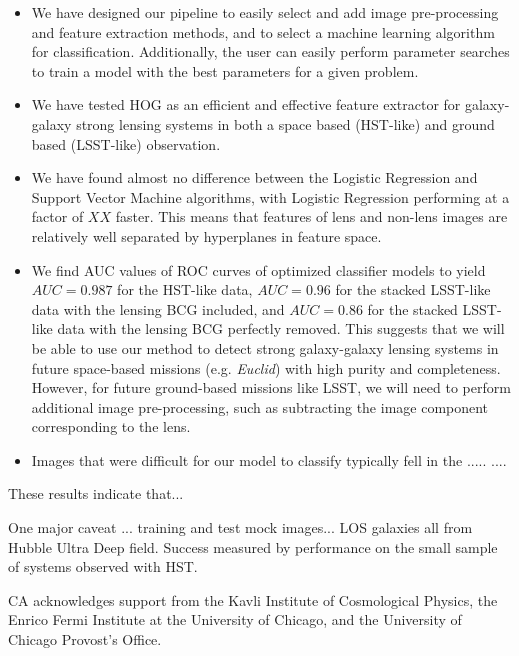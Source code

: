 \documentclass{emulateapj}
\begin{document}
\begin{itemize}

\item We have designed our pipeline to easily select and add image
  pre-processing and feature extraction methods, and to select a
  machine learning algorithm for classification.  Additionally, the
  user can easily perform parameter searches to train a model with the
  best parameters for a given problem.

\item We have tested HOG as an efficient and effective feature
  extractor for galaxy-galaxy strong lensing systems in both a space
  based (HST-like) and ground based (LSST-like) observation.  

\item We have found almost no difference between the Logistic
  Regression and Support Vector Machine algorithms, with Logistic
  Regression performing at a factor of $XX$ faster.  This means that
  features of lens and non-lens images are relatively well separated
  by hyperplanes in feature space.

\item We find AUC values of ROC curves of optimized classifier models
  to yield $AUC=0.987$ for the HST-like data, $AUC=0.96$ for the
  stacked LSST-like data with the lensing BCG included, and $AUC=0.86$
  for the stacked LSST-like data with the lensing BCG perfectly
  removed.  This suggests that we will be able to use our method to
  detect strong galaxy-galaxy lensing systems in future space-based
  missions (e.g. {\em Euclid}) with high purity and completeness.
  However, for future ground-based missions like LSST, we will need to
  perform additional image pre-processing, such as subtracting the
  image component corresponding to the lens.

\item Images that were difficult for our model to classify typically
  fell in the ..... ....

\end{itemize}

These results indicate that...

One major caveat ... training and test mock images... LOS galaxies all
from Hubble Ultra Deep field.  Success measured by performance on the
small sample of systems observed with HST.

% 

\acknowledgments CA acknowledges support from the Kavli Institute of
Cosmological Physics, the Enrico Fermi Institute at the University of
Chicago, and the University of Chicago Provost's Office.
\lastpagefootnotes



\end{document}
